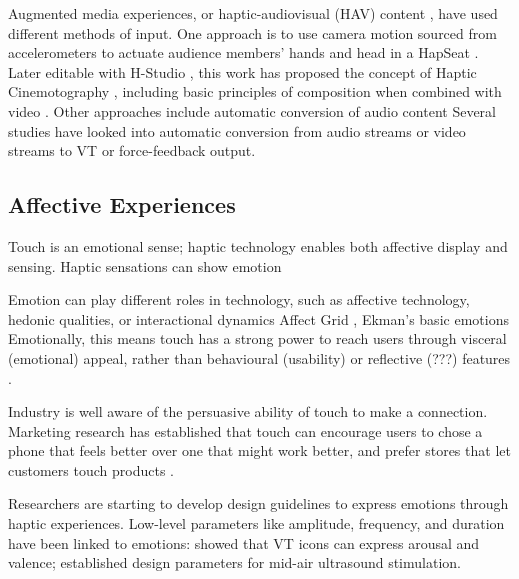 Augmented media experiences, or haptic-audiovisual (HAV) content \cite{Danieau2013},  have used different methods of input.
One approach is to use camera motion sourced from accelerometers \cite{Danieau2012} to actuate audience members' hands and head in a HapSeat \cite{Danieau2013a,Danieau2012a}.
Later editable with H-Studio \cite{Danieau2013c}, this work has proposed the concept of Haptic Cinemotography \cite{Danieau2014}, including basic principles of composition when combined with video \cite{Guillotel2016}.
Other approaches include automatic conversion of audio content
Several studies have looked into automatic conversion from audio streams \cite{Lee2013,Chang2005,Hwang2014} or video streams \cite{Kim2014} to VT or force-feedback output.


\subsection{Affective Experiences}
Touch is an emotional sense; haptic technology enables both affective display and sensing.
Haptic sensations can show emotion

Emotion can play different roles in technology, such as affective technology, hedonic qualities, or interactional dynamics \cite{Hook2008bodyemotion} 
Affect Grid \cite{Russell1989,Russell1989a}, Ekman's basic emotions \cite{Ekman1992,Ekman1971}
Emotionally, this means touch has a strong power to reach users through visceral (emotional) appeal, rather than behavioural (usability) or reflective (???) features \cite{Norman2004}.

Industry is well aware of the persuasive ability of touch to make a connection.
Marketing research has established that touch can encourage users to chose a phone that feels better over one that  might work better, and prefer stores that let customers touch products \cite{Spence2011,Jansson-Boyd2011}.


Researchers are starting to develop design guidelines to express emotions through haptic experiences.
Low-level parameters like amplitude, frequency, and duration have been linked to emotions: \citet{YongjaeYoo2015} showed that VT icons can express arousal and valence;
\citet{Obrist2015} established design parameters for mid-air ultrasound stimulation.


